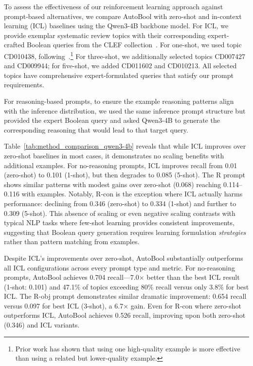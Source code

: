 To assess the effectiveness of our reinforcement learning approach against prompt-based alternatives, we compare AutoBool with zero-shot and in-context learning (ICL) baselines using the Qwen3-4B backbone model. For ICL, we provide exemplar systematic review topics with their corresponding expert-crafted Boolean queries from the CLEF collection~\cite{kanoulas2018clef}. For one-shot, we used topic CD010438, following~\citet{wang2025reassessing, wang2023can}.\footnote{Prior work has shown that using one high-quality example is more effective than using a related but lower-quality example.} For three-shot, we additionally selected topics CD007427 and CD009944; for five-shot, we added CD011602 and CD010213. All selected topics have comprehensive expert-formulated queries that satisfy our prompt requirements.

For reasoning-based prompts, to ensure the example reasoning patterns align with the inference distribution, we used the same inference prompt structure but provided the expert Boolean query and asked Qwen3-4B to generate the corresponding reasoning that would lead to that target query.

Table~\ref{tab:method_comparison_qwen3-4b} reveals that while ICL improves over zero-shot baselines in most cases, it demonstrates no scaling benefits with additional examples. For no-reasoning prompts, ICL improves recall from 0.01 (zero-shot) to 0.101 (1-shot), but then degrades to 0.085 (5-shot). The R prompt shows similar patterns with modest gains over zero-shot (0.068) reaching 0.114–0.116 with examples. Notably, R-con is the exception where ICL actually harms performance: declining from 0.346 (zero-shot) to 0.334 (1-shot) and further to 0.309 (5-shot). This absence of scaling or even negative scaling contrasts with typical NLP tasks where few-shot learning provides consistent improvements, suggesting that Boolean query generation requires learning formulation \emph{strategies} rather than pattern matching from examples.

Despite ICL's improvements over zero-shot, AutoBool substantially outperforms all ICL configurations across every prompt type and metric. For no-reasoning prompts, AutoBool achieves 0.704 recall—7.0× better than the best ICL result (1-shot: 0.101) and 47.1\% of topics exceeding 80\% recall versus only 3.8\% for best ICL. The R-obj prompt demonstrates similar dramatic improvement: 0.654 recall versus 0.097 for best ICL (3-shot), a 6.7× gain. Even for R-con where zero-shot outperforms ICL, AutoBool achieves 0.526 recall, improving upon both zero-shot (0.346) and ICL variants.

